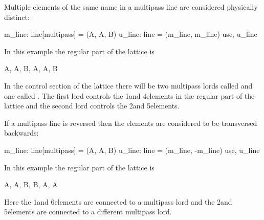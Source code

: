 Multiple elements of the same name in a multipass line are considered 
physically distinct:
\begin{example}
  m_line: line[multipass] = (A, A, B)
  u_line: line = (m_line, m_line)
  use, u_line
\end{example}
In this example the regular part of the lattice is
\begin{example}
  A, A, B, A, A, B
\end{example}
In the control section of the lattice there will be two multipass
lords called  and one called . The first  lord 
controls the 1\St and 4\Th elements in the regular part of the lattice 
and the second  lord controls the 2\Nd and 5\Th elements.

If a multipass line is reversed then the elements are considered to be
transversed backwards:
\begin{example}
  m_line: line[multipass] = (A, A, B)
  u_line: line = (m_line, -m_line)
  use, u_line
\end{example}
In this example the regular part of the lattice is
\begin{example}
  A, A, B, B, A, A
\end{example}
Here the 1\St and 6\Th elements are connected to a multipass lord and the
2\Nd and 5\Th elements are connected to a different multipass lord.